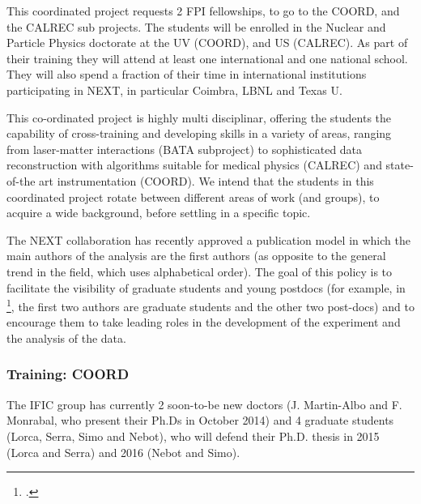 This coordinated project requests 2 FPI fellowships, to go to the COORD, and the CALREC sub projects. The students will be enrolled in the Nuclear and Particle Physics doctorate at the UV (COORD), and US (CALREC). As part of their training they will attend at least one international and one national school. They will also spend a fraction of their time in international institutions participating in NEXT, in particular Coimbra, LBNL and Texas U. 

This co-ordinated project is  highly multi disciplinar, offering the students the capability of cross-training and developing skills in a variety of areas, ranging from laser-matter interactions (BATA subproject) to sophisticated data reconstruction with algorithms suitable for medical physics (CALREC) and state-of-the art instrumentation (COORD). We intend that the students in this coordinated project rotate between different areas of work (and groups), to acquire a wide background, before settling in a specific topic. 

The NEXT collaboration has recently approved a publication model in which the main authors of the analysis are the first authors (as opposite to the general trend in the field, which uses alphabetical order). The goal of this policy is to facilitate the visibility of graduate students and young postdocs (for example, in \footcite{Lorca:2014sra}, the first two authors are graduate students and the other two post-docs) and to encourage them to take leading roles in the development of the experiment and the analysis of the data. 

\subsubsection*{Training: COORD}
The IFIC group has currently 2 soon-to-be new doctors (J. Martin-Albo and F. Monrabal, who present their Ph.Ds in October 2014) and 4 graduate students (Lorca, Serra, Simo and Nebot), who will defend their Ph.D. thesis in 2015 (Lorca and Serra) and 2016 (Nebot and Simo). 

